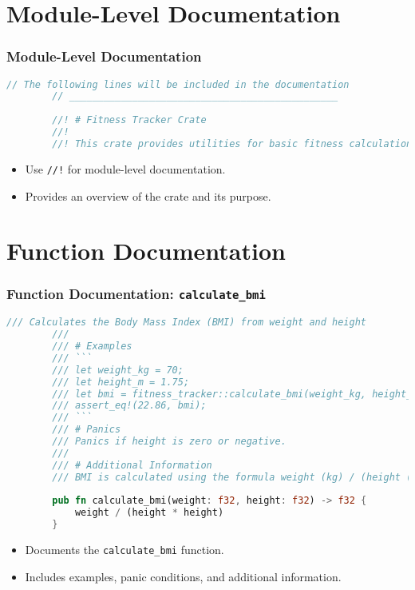 \documentclass[aspectratio=169, table]{beamer}
\begin{document}
\section{Module-Level Documentation}
\begin{frame}[fragile]
	\frametitle{Module-Level Documentation}
	\begin{lstlisting}[language=Rust]
		// The following lines will be included in the documentation 
		// _______________________________________________
		
		//! # Fitness Tracker Crate
		//! 
		//! This crate provides utilities for basic fitness calculations and metrics.
	\end{lstlisting}
	\begin{itemize}
		\item Use \texttt{//!} for module-level documentation.
		\item Provides an overview of the crate and its purpose.
	\end{itemize}
\end{frame}

\section{Function Documentation}
\begin{frame}[fragile]
	\frametitle{Function Documentation: \texttt{calculate\_bmi}}
	\begin{lstlisting}[language=Rust]
		/// Calculates the Body Mass Index (BMI) from weight and height
		/// 
		/// # Examples
		/// ```  
		/// let weight_kg = 70;
		/// let height_m = 1.75;
		/// let bmi = fitness_tracker::calculate_bmi(weight_kg, height_m);
		/// assert_eq!(22.86, bmi); 
		/// ``` 
		/// # Panics
		/// Panics if height is zero or negative.
		/// 
		/// # Additional Information
		/// BMI is calculated using the formula weight (kg) / (height (m) * height (m)).
		
		pub fn calculate_bmi(weight: f32, height: f32) -> f32 {
			weight / (height * height)
		} 
	\end{lstlisting}
	\begin{itemize}
		\item Documents the \texttt{calculate\_bmi} function.
		\item Includes examples, panic conditions, and additional information.
	\end{itemize}
\end{frame}
\end{document}
